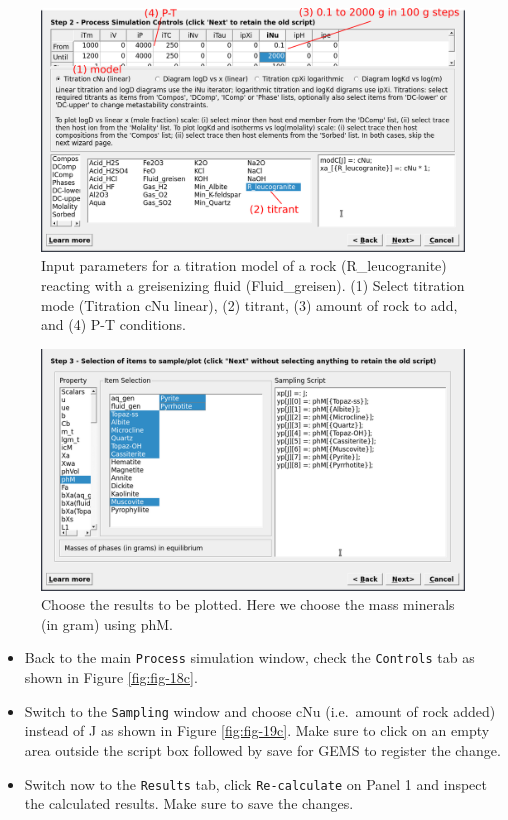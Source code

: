 \documentclass[
]{book}
\begin{document}
\begin{figure}
\includegraphics[width=1\linewidth]{figures/module3/fig-16} \caption{Input parameters for a titration model of a rock (R\_leucogranite) reacting with a greisenizing fluid (Fluid\_greisen). (1) Select titration mode (Titration cNu linear), (2) titrant, (3) amount of rock to add, and (4) P-T conditions.}\label{fig:fig-16c}
\end{figure}

\begin{figure}
\includegraphics[width=1\linewidth]{figures/module3/fig-17} \caption{Choose the results to be plotted. Here we choose the mass minerals (in gram) using phM.}\label{fig:fig-17c}
\end{figure}

\begin{itemize}
\item
  Back to the main \texttt{Process} simulation window, check the \texttt{Controls} tab as shown in Figure \ref{fig:fig-18c}.
\item
  Switch to the \texttt{Sampling} window and choose cNu (i.e.~amount of rock added) instead of J as shown in Figure \ref{fig:fig-19c}. Make sure to click on an empty area outside the script box followed by save for GEMS to register the change.
\item
  Switch now to the \texttt{Results} tab, click \texttt{Re-calculate} on Panel 1 and inspect the calculated results. Make sure to save the changes.
\end{itemize}
\end{document}
